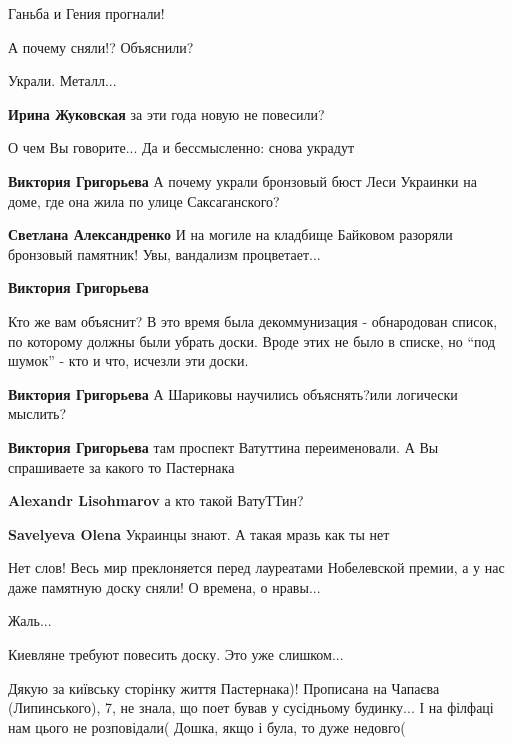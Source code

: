 \begin{itemize}
Ганьба и Гения прогнали!

А почему сняли!? Объяснили?

\begin{itemize} %
Украли. Металл...

\textbf{Ирина Жуковская} за эти года новую не повесили?

О чем Вы говорите... Да и бессмысленно: снова украдут

\textbf{Виктория Григорьева} А почему украли бронзовый бюст Леси Украинки на доме, где она жила по улице Саксаганского?

\textbf{Светлана Александренко}
И на могиле на кладбище Байковом разоряли бронзовый памятник! Увы, вандализм процветает...

\textbf{Виктория Григорьева}

Кто же вам объяснит? В это время была декоммунизация - обнародован список, по
которому должны были убрать доски. Вроде этих не было в списке, но \enquote{под шумок}
- кто и что, исчезли эти доски.

\textbf{Виктория Григорьева} А Шариковы научились объяснять?или логически мыслить?

\textbf{Виктория Григорьева} там проспект Ватуттина переименовали.
А Вы спрашиваете за какого то Пастернака

\textbf{Alexandr Lisohmarov} а кто такой ВатуТТин?

\textbf{Savelyeva Olena} Украинцы знают.
А такая мразь как ты нет
\end{itemize} %

Нет слов! Весь мир преклоняется перед лауреатами Нобелевской премии, а у нас
даже памятную доску сняли! О времена, о нравы...

Жаль...

Киевляне требуют повесить доску. Это уже слишком...


Дякую за київську сторінку життя Пастернака)! Прописана на Чапаєва
(Липинського), 7, не знала, що поет бував у сусідньому будинку... І на філфаці
нам цього не розповідали( Дошка, якщо і була, то дуже недовго(


\end{itemize}
